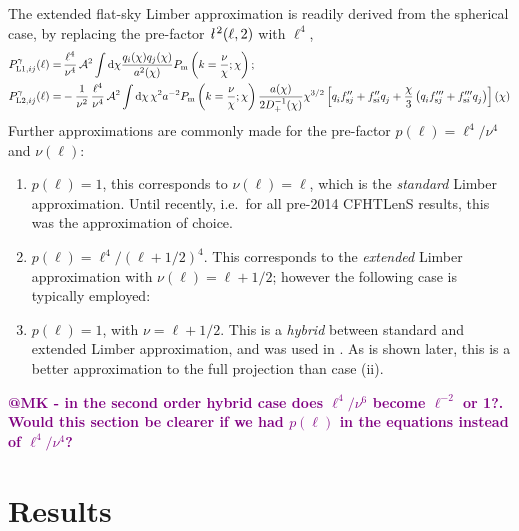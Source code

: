 \documentclass[fleqn,usenatbib]{mnras} %
\newcommand{\ellbar}{\hbox{\it \l}\,}
\newcommand{\pref}{{\cal A}}
\newcommand{\ch}[1]{\textcolor{purple}{\bf #1}}
\begin{document}
The extended flat-sky Limber approximation is readily derived from the
spherical case, by replacing the pre-factor $\ellbar^2(\ell, 2)$ with $\ell^4$,
%
\begin{align}
  P^\gamma_{{\rm L1}, ij}(\ell) = & \, \frac{\ell^4}{\nu^4} \, \pref^2 \int {\rm d} \chi \frac{ q_i(\chi) q_j(\chi) }{a^2(\chi)}
  P_{\rm m}\left(k = \frac{\nu}{\chi}; \chi\right);
  \label{eq:P_ell_limber1}
  \\
    P^\gamma_{{\rm L2}, ij}(\ell) = & - \frac 1 {\nu^2} \, \frac{\ell^4}{\nu^4} \, \pref^2
    \int {\rm d} \chi \, \chi^{2} a^{-2} P_{\rm m}\left(k = \frac\nu\chi; \chi\right)
    \frac{a(\chi)}{2 D^{-1}_+(\chi)} \chi^{3/2} \left[ q^{}_i f^{\prime\prime}_{{\rm s}j} + f^{\prime\prime}_{{\rm s}i} q^{}_j  
      + \frac{\chi}{3} \left( q^{}_i f^{\prime\prime\prime}_{{\rm s}j} + f^{\prime\prime\prime}_{{\rm s}i} q^{}_j
      \right)
    \right](\chi)
  \label{eq:P_ell_limber2}
\end{align}
%
Further approximations are commonly made for the pre-factor $p(\ell) = \ell^4/\nu^4$ and $\nu(\ell)$:
%
\begin{enumerate}
  \item $p(\ell) = 1$, this corresponds to $\nu(\ell) = \ell$, which is the \emph{standard} Limber approximation.
    Until recently, i.e.~for all pre-2014 CFHTLenS results, this was the approximation of choice.
  \item $p(\ell) = \ell^4/(\ell + 1/2)^4$. This corresponds to the \emph{extended} Limber
    approximation with $\nu(\ell) = \ell + 1/2$; however the following case is typically employed:
  \item $p(\ell) = 1$, with $\nu = \ell + 1/2$. This is
    a \emph{hybrid} between
    standard and extended Limber approximation, and was used in \cite{KiDS-450,joudaki/etal:2016}. As is shown
    later, this is a better approximation to the full projection than case (ii).
\end{enumerate}
\ch{@MK - in the second order hybrid case does $\ell^4 / \nu^6$ become $\ell^{-2}$ or 1?.  Would this section be clearer if we had $p(\ell)$ in the equations instead of 
$\ell^4/\nu^4$?}


\section{Results}
\label{sec:results}
\end{document}
